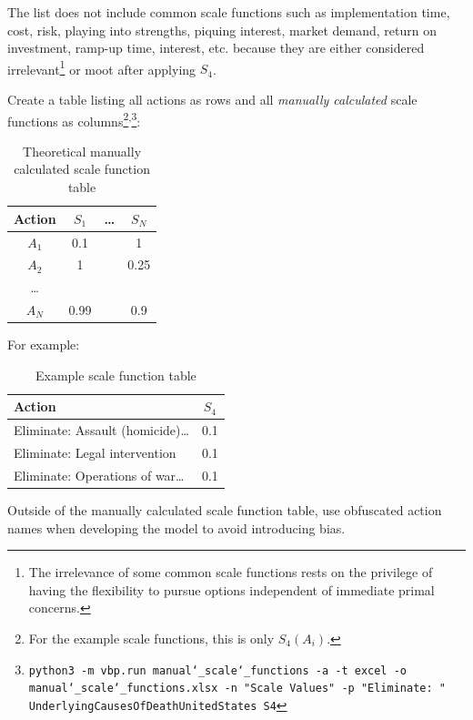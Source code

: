 \documentclass[12pt, a4paper, twocolumn]{article}
\begin{document}
The list does not include common scale functions such as implementation time, cost, risk, playing into strengths, piquing interest, market demand, return on investment, ramp-up time, interest, etc. because they are either considered irrelevant\footnote{The irrelevance of some common scale functions rests on the privilege of having the flexibility to pursue options independent of immediate primal concerns.} or moot after applying $S_4$.

Create a table listing all actions as rows and all \textit{manually calculated} scale functions as columns\footnote{For the example scale functions, this is only $S_4(A_i)$.}\textsuperscript{,}\footnote{\texttt{python3 -m vbp.run manual\char`_scale\char`_functions -a -t excel -o manual\char`_scale\char`_functions.xlsx -n "Scale Values" -p "Eliminate: " UnderlyingCausesOfDeathUnitedStates S4}}:

\begin{table}[H]
  \centering
  \begin{tabular}{cccc}
    \toprule
      Action & $S_1$  & \ldots & $S_N$  \\
    \midrule
      $A_1$  & 0.1    &        & 1      \\
      $A_2$  & 1      &        & 0.25   \\
      \ldots &        &        &        \\
      $A_N$  & 0.99   &        & 0.9    \\
    \bottomrule
  \end{tabular}
  \caption{Theoretical manually calculated scale function table}
  \label{table:scaletable}
\end{table}

For example:

\begin{table}[H]
  \centering
  \begin{tabular}{lc}
    \toprule
      Action                                 & $S_4$ \\
    \midrule
      Eliminate: Assault (homicide)\ldots    & 0.1   \\
      Eliminate: Legal intervention          & 0.1   \\
      Eliminate: Operations of war\ldots     & 0.1   \\
    \bottomrule
  \end{tabular}
  \caption{Example scale function table}
  \label{table:exscaletable}
\end{table}

Outside of the manually calculated scale function table, use obfuscated action names when developing the model to avoid introducing bias.
\end{document}
